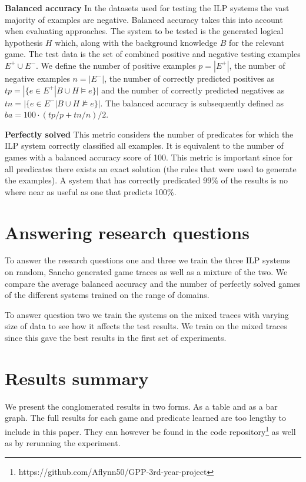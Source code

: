 \textbf{Balanced accuracy} In the datasets used for testing the ILP systems the vast majority of examples are negative. Balanced accuracy takes this into account when evaluating approaches. The system to be tested is the generated logical hypothesis $H$ which, along with the background knowledge $B$ for the relevant game. The test data is the set of combined positive and negative testing examples $E^+ \cup E^-$. We define the number of positive examples $p = |E^+|$, the number of negative examples $n = |E^-|$, the number of correctly predicted positives as $tp = |\{e\in E^+|B\cup H \models e\}|$ and the number of correctly predicted negatives as $tn = |\{e\in E^-|B\cup H \not\models e\}|$. The balanced accuracy is subsequently defined as $ba = 100 \cdot (tp/p + tn/n)/2$.

\textbf{Perfectly solved} This metric considers the number of predicates for which the ILP system correctly classified all examples. It is equivalent to the number of games with a balanced accuracy score of 100. This metric is important since for all predicates there exists an exact solution (the rules that were used to generate the examples). A system that has correctly predicated 99\% of the results is no where near as useful as one that predicts 100\%.

\section{Answering research questions}
To answer the research questions one and three we train the three ILP systems on random, Sancho generated game traces as well as a mixture of the two. We compare the average balanced accuracy and the number of perfectly solved games of the different systems trained on the range of domains. 

To answer question two we train the systems on the mixed traces with varying size of data to see how it affects the test results. We train on the mixed traces since this gave the best results in the first set of experiments.
\section{Results summary}
We present the conglomerated results in two forms. As a table and as a bar graph. The full results for each game and predicate learned are too lengthy to include in this paper. They can however be found in the code repository\footnote{https://github.com/Aflynn50/GPP-3rd-year-project} as well as by rerunning the experiment. 

